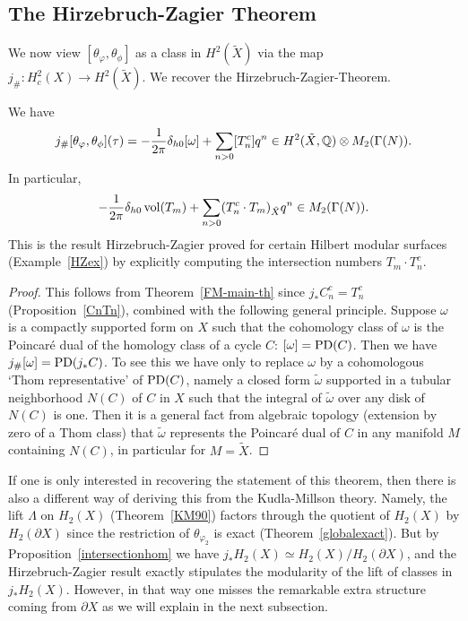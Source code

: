 \subsection{The Hirzebruch-Zagier Theorem} 

We now view $[\theta_{\varphi}, \theta_{\phi}]$ as a class in $H^2(\tilde{X})$ via the map $j_{\#}: H_c^2(X) \to H^2(\tilde{X})$. We recover the Hirzebruch-Zagier-Theorem. 

\begin{theorem}\label{HZTheorem}
We have 
\[
j_{\#}[\theta_{\varphi}, \theta_{\phi}](\tau) =  -\frac{1}{2\pi}\delta_{h0} [\omega] + \sum_{n>0} [T^c_n] q^n \in H^2(\tilde{X},\mathbb{Q}) \otimes M_2(\Gamma(N)).
\]
In particular,
\[
 -\frac{1}{2\pi}\delta_{h0} \operatorname{vol}(T_m) + \sum_{n>0} (T_n^c \cdot T_m)_{\tilde{X}} q^n \in M_2(\Gamma(N)).
\]
This is the result Hirzebruch-Zagier proved for certain Hilbert modular surfaces (Example~\ref{HZex}) by explicitly computing the intersection numbers $T_m \cdot T^c_n $.
\end{theorem}

\begin{proof}

This follows from Theorem~\ref{FM-main-th} since $j_{\ast} C_n^c = T_n^c$ (Proposition~\ref{CnTn}), combined with the following general principle.
Suppose $\omega$ is a compactly supported form on $X$ such that the cohomology class of $\omega$ is the Poincar\'e dual of the homology class of a cycle $C$: $[\omega] = \operatorname{PD}(C)$. Then we have $ j_{\#}[\omega] = \operatorname{PD}( j_* C)$.
To see this we have only to replace $\omega$ by a cohomologous  `Thom representative' of $\operatorname{PD}(C)$, namely a closed form $\tilde{\omega}$ supported in a tubular neighborhood $N(C)$ of $C$ in $X$ such that the integral of $\tilde{\omega}$ over any disk of $N(C)$ is one. Then it is a general fact from algebraic topology (extension by zero of a Thom class)  that $\tilde{\omega}$ represents the Poincar\'e dual of $C$ in any manifold $M$ containing $N(C)$, in particular for $M = \tilde{X}$.
\end{proof}


\begin{remark}
If one is only interested in recovering the statement of this theorem, then there is also a different way of deriving this from the Kudla-Millson theory. Namely, the lift $\Lambda$ on $H_2(X)$ (Theorem~\ref{KM90}) factors through the quotient of $H_2(X)$ by $H_2(\partial X)$ since the restriction of $\theta_{\varphi_2}$ is exact (Theorem~\ref{globalexact}). But by Proposition~\ref{intersectionhom} we have $j_{\ast} H_2(X) \simeq H_2(X)/  H_2(\partial X)$, and the Hirzebruch-Zagier result exactly stipulates the modularity of the lift of classes in $j_{\ast} H_2(X)$. However, in that way one misses the  remarkable  extra structure coming from $\partial X$ as we will explain in the next subsection.
\end{remark}


